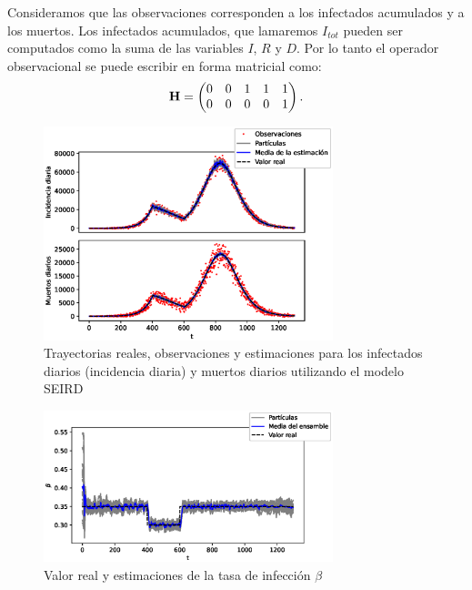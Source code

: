 Consideramos que las observaciones corresponden a los infectados acumulados y a los muertos. Los infectados acumulados, que lamaremos $I_{tot}$ pueden ser computados como la suma de las variables $I$, $R$ y $D$. Por lo tanto el operador observacional se puede escribir en forma matricial como:
\begin{align*}
    \mathbf{H} = 
    \begin{pmatrix}
        0 & 0 & 1 & 1 & 1 \\
        0 & 0 & 0 & 0 & 1 
    \end{pmatrix}.
\end{align*}
\begin{figure}[h]
    \centering
    \includegraphics[width=0.75\textwidth]{figs/seird_online_em_aug_state_state_vars.eps}
    \caption{Trayectorias reales, observaciones y estimaciones para los infectados diarios (incidencia diaria) y muertos diarios utilizando el modelo SEIRD}
    \label{fig:seird_online_em_aug_state_state_vars}
\end{figure}
\begin{figure}[h]
    \centering
    \includegraphics[width=0.75\textwidth]{figs/seird_online_em_aug_state_beta.eps}
    \caption{Valor real y estimaciones de la tasa de infección $\beta$}
    \label{fig:seird_online_em_aug_state_beta}
\end{figure}
